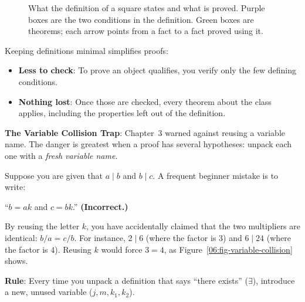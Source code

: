 \begin{figure}[htbp]
\centering
{}
\caption{What the definition of a square states and what is proved. Purple boxes are the two conditions in the definition. Green boxes are theorems; each arrow points from a fact to a fact proved using it.}
\label{06:fig-square-dependencies}
\end{figure}

Keeping definitions minimal simplifies proofs:
\begin{itemize}
\item \textbf{Less to check}: To prove an object qualifies, you verify only the few defining conditions.
\item \textbf{Nothing lost}: Once those are checked, every theorem about the class applies, including the properties left out of the definition.
\end{itemize}

\begin{trapbox}
\textbf{The Variable Collision Trap}: Chapter~3 warned against reusing a variable name. The danger is greatest when a proof has several hypotheses: unpack each one with a \emph{fresh variable name}.

Suppose you are given that $a \mid b$ and $b \mid c$. A frequent beginner mistake is to write:
\begin{center}
``$b = ak$ and $c = bk$.'' \quad \textbf{(Incorrect.)}
\end{center}
By reusing the letter $k$, you have accidentally claimed that the two multipliers are identical: $b/a = c/b$. For instance, $2 \mid 6$ (where the factor is $3$) and $6 \mid 24$ (where the factor is $4$). Reusing $k$ would force $3 = 4$, as Figure~\ref{06:fig-variable-collision} shows.

\textbf{Rule}: Every time you unpack a definition that says ``there exists'' ($\exists$), introduce a new, unused variable ($j, m, k_1, k_2$).
\end{trapbox}

